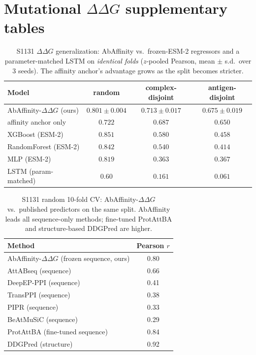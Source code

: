 \documentclass{article}
\newcommand{\ddg}{\ensuremath{\Delta\Delta G}}
\begin{document}
\section{Mutational \ddg{} supplementary tables}

\begin{table}[h]\centering
\caption{S1131 \ddg{} generalization: AbAffinity vs.\ frozen-ESM-2 regressors and a parameter-matched
LSTM on \emph{identical folds} ($z$-pooled Pearson, mean $\pm$ s.d.\ over 3 seeds). The affinity anchor's
advantage grows as the split becomes stricter.}
\begin{tabular}{lccc}
\toprule
Model & random & complex-disjoint & antigen-disjoint\\
\midrule
AbAffinity-\ddg{} (ours) & $0.801\pm0.004$ & $\mathbf{0.713\pm0.017}$ & $\mathbf{0.675\pm0.019}$\\
affinity anchor only     & $0.722$ & $0.687$ & $0.650$\\
XGBoost (ESM-2)          & $0.851$ & $0.580$ & $0.458$\\
RandomForest (ESM-2)     & $0.842$ & $0.540$ & $0.414$\\
MLP (ESM-2)              & $0.819$ & $0.363$ & $0.367$\\
LSTM (param-matched)     & $0.60$  & $0.161$ & $0.061$\\
\bottomrule
\end{tabular}
\end{table}

\begin{table}[h]\centering
\caption{S1131 random 10-fold CV: AbAffinity-\ddg{} vs.\ published predictors on the same split.
AbAffinity leads all sequence-only methods; fine-tuned ProtAttBA and structure-based DDGPred are higher.}
\begin{tabular}{lc}
\toprule
Method & Pearson $r$\\
\midrule
AbAffinity-\ddg{} (frozen sequence, ours) & $\mathbf{0.80}$\\
AttABseq (sequence)      & 0.66\\
DeepEP-PPI (sequence)    & 0.41\\
TransPPI (sequence)      & 0.38\\
PIPR (sequence)          & 0.33\\
BeAtMuSiC (sequence)     & 0.29\\
\midrule
ProtAttBA (fine-tuned sequence) & 0.84\\
DDGPred (structure)             & 0.92\\
\bottomrule
\end{tabular}
\end{table}
\end{document}
